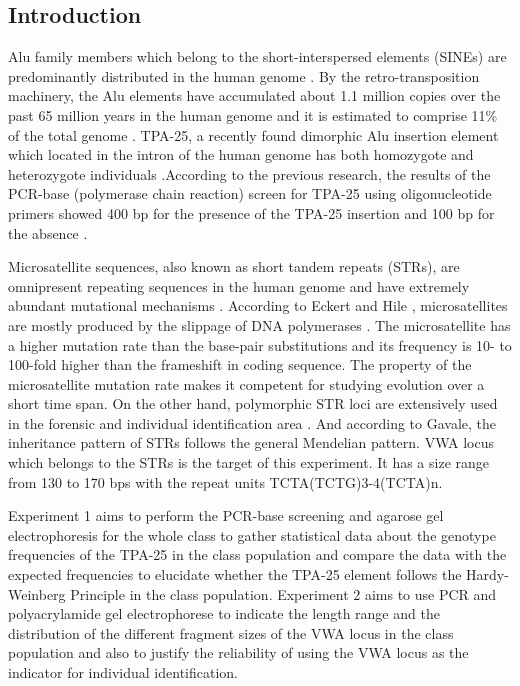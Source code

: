 \documentclass[a4paper,10pt]{article}
\begin{document}
\begin{multicols}{2}
\section{Introduction}

Alu family members which belong to the short-interspersed elements (SINEs) are predominantly distributed in the human genome \cite{harris2017unbiased}. By the retro-transposition machinery, the Alu elements have accumulated about 1.1 million copies over the past 65 million years in the human genome and it is estimated to comprise 11\% of the total genome \cite{venter2001sequence}. TPA-25, a recently found dimorphic Alu insertion element which located in the intron of the human genome has both homozygote and heterozygote individuals \cite{perna1992alu}.According to the previous research, the results of the PCR-base (polymerase chain reaction) screen for TPA-25 using oligonucleotide primers showed 400 bp for the presence of the TPA-25 insertion and 100 bp for the absence \cite{batzer1991amplification}.

Microsatellite sequences, also known as short tandem repeats (STRs), are omnipresent repeating sequences in the human genome and have extremely abundant mutational mechanisms \cite{wiegand2000microsatellite}. According to Eckert and Hile , microsatellites are mostly produced by the slippage of DNA polymerases \cite{eckert2009every}. The microsatellite has a higher mutation rate than the base-pair substitutions and its frequency is 10- to 100-fold higher than the frameshift in coding sequence. The property of the microsatellite mutation rate makes it competent for studying evolution over a short time span. On the other hand, polymorphic STR loci are extensively used in the forensic and individual identification area \cite{gavale2024rare}. And according to Gavale, the inheritance pattern of STRs follows the general Mendelian pattern. VWA locus which belongs to the STRs is the target of this experiment. It has a size range from 130 to 170 bps with the repeat units TCTA(TCTG)3-4(TCTA)n.

Experiment 1 aims to perform the PCR-base screening and agarose gel electrophoresis for the whole class to gather statistical data about the genotype frequencies of the TPA-25 in the class population and compare the data with the expected frequencies to elucidate whether the TPA-25 element follows the Hardy-Weinberg Principle in the class population. Experiment 2 aims to use PCR and polyacrylamide gel electrophorese to indicate the length range and the distribution of the different fragment sizes of the VWA locus in the class population and also to justify the reliability of using the VWA locus as the indicator for individual identification.




\end{multicols}
\end{document}
